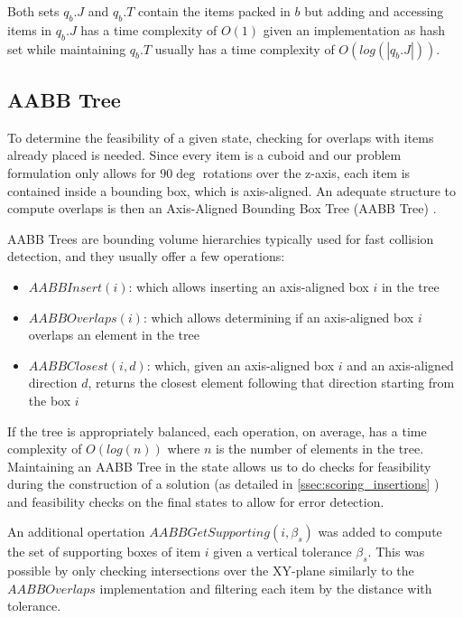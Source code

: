 Both sets $q_b.J$ and $q_b.T$ contain the items packed in $b$ but adding and accessing items in $q_b.J$ has a time complexity of $O(1)$ given an implementation as hash set while maintaining $q_b.T$ usually has a time complexity of $O(log(|q_b.J|))$.

\subsection{AABB Tree}
\label{sec:problem_state:aabbtree}%

To determine the feasibility of a given state, checking for overlaps with items already placed is needed.
Since every item is a cuboid and our problem formulation only allows for $90\deg$ rotations over the z-axis, each item is contained inside a bounding box, which is axis-aligned.
An adequate structure to compute overlaps is then an Axis-Aligned Bounding Box Tree (AABB Tree) \cite{bergen1997efficient}.

AABB Trees are bounding volume hierarchies typically used for fast collision detection, and they usually offer a few operations:
\begin{itemize}
    \item $AABBInsert(i)$: which allows inserting an axis-aligned box $i$ in the tree
    \item $AABBOverlaps(i)$: which allows determining if an axis-aligned box $i$ overlaps an element in the tree
    \item $AABBClosest(i, d)$: which, given an axis-aligned box $i$ and an axis-aligned direction $d$, returns the closest element following that direction starting from the box $i$
\end{itemize}

If the tree is appropriately balanced, each operation, on average, has a time complexity of $O(log(n))$ where $n$ is the number of elements in the tree.
Maintaining an AABB Tree in the state allows us to do checks for feasibility during the construction of a solution (as detailed in \ref{ssec:scoring_insertions} ) and feasibility checks on the final states to allow for error detection.

\label{aabb:get_supporting}%
An additional opertation $AABBGetSupporting(i, \beta_s)$ was added to compute the set of supporting boxes of item $i$ given a vertical tolerance $\beta_s$.
This was possible by only checking intersections over the XY-plane similarly to the $AABBOverlaps$ implementation and filtering each item by the distance with tolerance.

